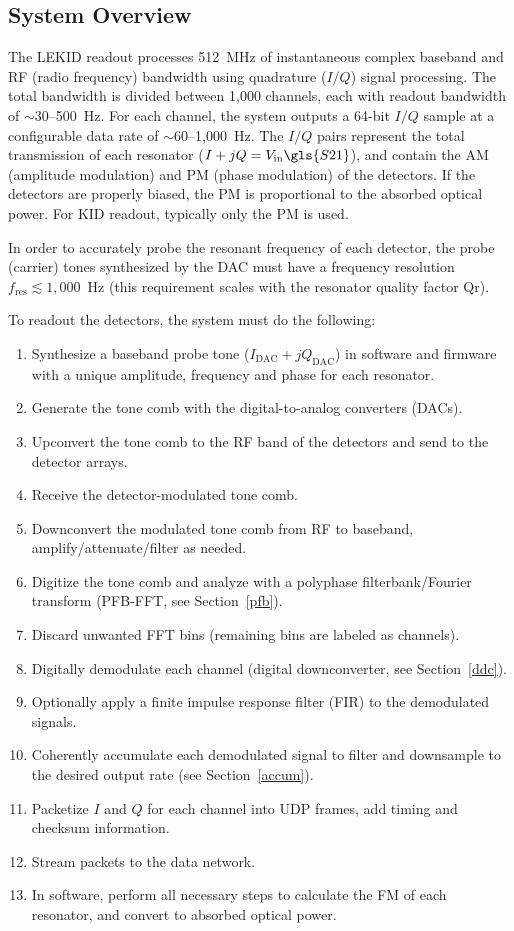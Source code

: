 \subsection{System Overview}\label{sys overview}

The LEKID readout processes 512~MHz of instantaneous complex baseband and RF (radio frequency) bandwidth using quadrature ($I/Q$) signal processing. The total bandwidth is divided between 1,000 channels, each with readout bandwidth of $\sim$30--500~Hz. For each channel, the system outputs a 64-bit $I/Q$ sample at a configurable data rate of $\sim$60--1,000~Hz. The $I/Q$ pairs represent the total transmission of each resonator ($I + jQ = V_{\mathrm{in}}\gls{S21}$), and contain the AM (amplitude modulation) and PM (phase modulation) of the detectors. If the detectors are properly biased, the PM is proportional to the absorbed optical power. For KID readout, typically only the PM is used.

In order to accurately probe the resonant frequency of each detector, the probe (carrier) tones synthesized by the DAC must have a frequency resolution $f_{\mathrm{res}} \lesssim 1,000$~Hz (this requirement scales with the resonator quality factor \gls{Qr}).


To readout the detectors, the system must do the following:

\begin{enumerate}[nosep]
  \item Synthesize a baseband probe tone ($I_{\mathrm{DAC}} + jQ_{\mathrm{DAC}}$) in software and firmware with a unique amplitude, frequency and phase for each resonator.
  \item Generate the tone comb with the digital-to-analog converters (DACs).
  \item Upconvert the tone comb to the RF band of the detectors and send to the detector arrays.
  \item Receive the detector-modulated tone comb.
  \item Downconvert the modulated tone comb from RF to baseband, amplify/attenuate/filter as needed.
  \item Digitize the tone comb and analyze with a polyphase filterbank/Fourier transform (PFB-FFT, see Section~\ref{pfb}).
  \item Discard unwanted FFT bins (remaining bins are labeled as channels).
  \item Digitally demodulate each channel (digital downconverter, see Section~\ref{ddc}).
  \item Optionally apply a finite impulse response filter (FIR) to the demodulated signals.
  \item Coherently accumulate each demodulated signal to filter and downsample to the desired output rate (see Section~\ref{accum}).
  \item Packetize $I$ and $Q$ for each channel into UDP frames, add timing and checksum information.
  \item Stream packets to the data network.
  \item In software, perform all necessary steps to calculate the FM of each resonator, and convert to absorbed optical power.
\end{enumerate}

